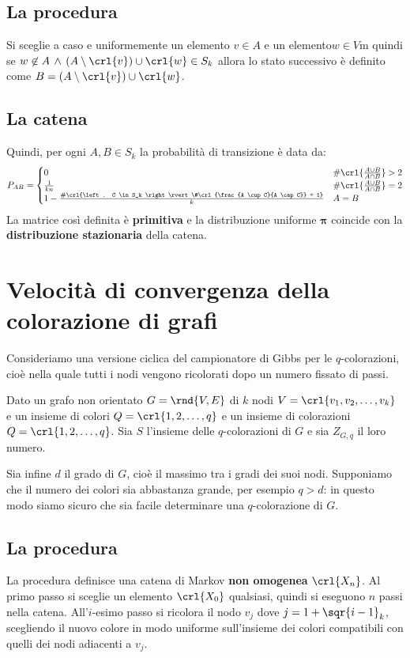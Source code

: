 \documentclass[\main/main.tex]{subfiles}
\begin{document}
\subsection{La procedura}
Si sceglie a caso e uniformemente un elemento \(v \in A\) e un elemento\(w \in V\)m quindi se \(w \not\in A \, \land \, (A\setminus \crl{v}) \cup \crl{w} \in S_k\) allora lo stato successivo è definito come \(B = (A\setminus \crl{v}) \cup \crl{w}\).

\subsection{La catena}
Quindi, per ogni \(A, B \in S_k\) la probabilità di transizione è data da:
\[
  P_{AB} = \begin{cases}
    0                                                                                         & \#\crl{\frac{A \cup B}{A \cap B}} > 2 \\
    \frac{1}{kn}                                                                              & \#\crl{\frac{A \cup B}{A \cap B}} = 2 \\
    1 - \frac{\#\crl{\left. C \in S_k \right\rvert \#\crl{\frac{A \cup C}{A \cap C}} = 1}}{k} & A = B
  \end{cases}
\]
La matrice così definita è \textbf{primitiva} e la distribuzione uniforme \(\bm{\pi} \) coincide con la \textbf{distribuzione stazionaria} della catena.

\clearpage
\section{Velocità di convergenza della colorazione di grafi}
Consideriamo una versione ciclica del campionatore di Gibbs per le \(q\)-colorazioni, cioè nella quale tutti i nodi vengono ricolorati dopo un numero fissato di passi.

Dato un grafo non orientato \(G = \rnd{V, E}\) di \(k\) nodi \(V = \crl{v_1, v_2, \ldots, v_k}\) e un insieme di colori \(Q = \crl{1, 2, \ldots, q}\) e un insieme di colorazioni \(Q = \crl{1, 2, \ldots, q}\). Sia \(S\) l'insieme delle \(q\)-colorazioni di \(G\) e sia \(Z_{G, q}\) il loro numero.

Sia infine \(d\) il grado di \(G\), cioè il massimo tra i gradi dei suoi nodi. Supponiamo che il numero dei colori sia abbastanza grande, per esempio \(q>d\): in questo modo siamo sicuro che sia facile determinare una \(q\)-colorazione di \(G\).

\subsection{La procedura}
La procedura definisce una catena di Markov \textbf{non omogenea} \(\crl{X_n}\). Al primo passo si sceglie un elemento \(\crl{X_0}\) qualsiasi, quindi si eseguono \(n\) passi nella catena. All'\(i\)-esimo passo si ricolora il nodo \(v_j\) dove \(j=1+\sqr{i-1}_k\), scegliendo il nuovo colore in modo uniforme sull'insieme dei colori compatibili con quelli dei nodi adiacenti a \(v_j\).
\end{document}
